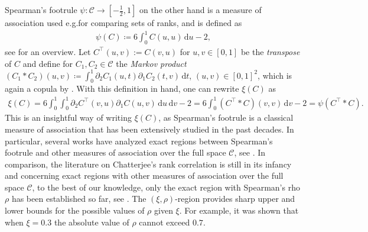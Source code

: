 \documentclass{article}
\newcommand{\1}{\mathds{1}}
\newcommand{\de}{\mathrm{\,d}}
\newcommand{\CC}{\mathcal{C}}  %
\begin{document}
Spearman's footrule \(\psi:\CC\rightarrow[-\frac12,1]\) on the other hand is a measure of association used e.g.\;for comparing sets of ranks, and is defined as
\begin{align}\label{eq:psi-definition}
\psi(C) \coloneq 6 \int_0^1 C(u,u) \de u - 2,
\end{align}
see \cite{genest2010spearman} for an overview.
Let \(C^\top(u,v) := C(v,u)\) for $u,v\in[0,1]$ be the \emph{transpose} of $C$ and define for $C_1,C_2\in\CC$ the \emph{Markov product} \((C_1 \ast C_2)(u,v) \coloneq \int_0^1 \partial_2 C_1(u,t)\partial_1 C_2(t,v) \de t\), $(u,v)\in[0,1]^2$, which is again a copula by \cite[Thm.~2.1]{darsow1992copulas}.
With this definition in hand, one can rewrite \(\xi(C)\) as
\begin{align}\label{eq:xi-psi-relation}
\xi(C)
= 6\int_0^1 \int_0^1 \partial_2 C^\top(v,u) \partial_1 C(u,v) \de u \de v - 2
= 6\int_0^1 (C^\top\ast C)(v,v) \de v - 2
= \psi(C^\top \ast C).
\end{align}
This is an insightful way of writing \(\xi(C)\), as Spearman's footrule is a classical measure of association that has been extensively studied in the past decades.
In particular, several works have analyzed exact regions between Spearman's footrule and other measures of association over the full space $\CC$, see \cite{kokol2022exact,bukovvsek2023exact,bukovvsek2024exact,kokol2021exact,tschimpke2025revisiting}.
In comparison, the literature on Chatterjee's rank correlation is still in its infancy and concerning exact regions with other measures of association over the full space $\CC$, to the best of our knowledge, only the exact region with Spearman's rho $\rho$ has been established so far, see \cite{ansari2025exact}.
The $(\xi,\rho)$-region provides sharp upper and lower bounds for the possible values of $\rho$ given $\xi$.
For example, it was shown that when $\xi=0.3$ the absolute value of $\rho$ cannot exceed $0.7$.
\end{document}
